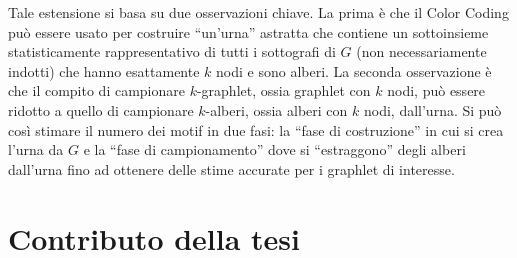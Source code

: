 Tale estensione si basa su due osservazioni chiave.
La prima \`e che il Color Coding pu\`o essere usato per costruire ``un'urna'' astratta che contiene un sottoinsieme statisticamente rappresentativo di tutti i sottografi di $G$ (non necessariamente indotti) che hanno esattamente $ k $ nodi e sono alberi.
La seconda osservazione \`e che il compito di campionare $ k $-graphlet, ossia graphlet con $ k $ nodi, pu\`o essere ridotto a quello di campionare $ k $-alberi, ossia alberi con $ k $ nodi, dall'urna.
Si pu\`o cos\`i stimare il numero dei motif in due fasi: la ``fase di costruzione'' in cui si crea l'urna da $G$ e la ``fase di campionamento'' dove si ``estraggono'' degli alberi dall'urna fino ad ottenere delle stime accurate per i graphlet di interesse.

\section{Contributo della tesi}

